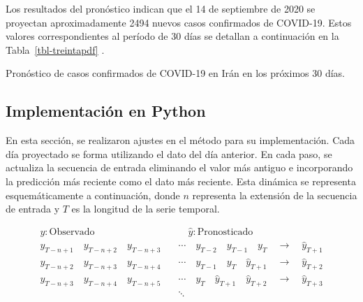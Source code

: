\documentclass[
  us-letterpaper,
]{scrreprt}
\theoremstyle{plain}
\theoremstyle{definition}
\theoremstyle{definition}
\theoremstyle{plain}
\theoremstyle{remark}
\begin{document}
Los resultados del pronóstico indican que el 14 de septiembre de 2020 se
proyectan aproximadamente 2494 nuevos casos confirmados de COVID-19.
Estos valores correspondientes al período de 30 días se detallan a
continuación en la Tabla~\ref{tbl-treintapdf} .

\begin{table}

\caption{\label{tbl-treintapdf}Pronóstico de casos confirmados de
COVID-19 en Irán en los próximos 30 días.}


\end{table}%

\subsection{Implementación en Python}\label{implementaciuxf3n-en-python}

En esta sección, se realizaron ajustes en el método para su
implementación. Cada día proyectado se forma utilizando el dato del día
anterior. En cada paso, se actualiza la secuencia de entrada eliminando
el valor más antiguo e incorporando la predicción más reciente como el
dato más reciente. Esta dinámica se representa esquemáticamente a
continuación, donde \(n\) representa la extensión de la secuencia de
entrada y \(T\) es la longitud de la serie temporal.

\[
\begin{split}
y:\text{Observado}\quad &\quad \hat{y}:\text{Pronosticado}\\
y_{T-n+1}\quad y_{T-n+2}\quad y_{T-n+3}\quad&\cdots\quad y_{T-2}\quad y_{T-1}\quad y_T\quad \to\quad \hat{y}_{T+1}\\
y_{T-n+2}\quad y_{T-n+3}\quad y_{T-n+4}\quad&\cdots\quad y_{T-1}\quad y_{T}\quad \hat{y}_{T+1}\quad \to\quad \hat{y}_{T+2}\\
y_{T-n+3}\quad y_{T-n+4}\quad y_{T-n+5}\quad&\cdots\quad y_{T}\quad \hat{y}_{T+1}\quad \hat{y}_{T+2}\quad \to\quad \hat{y}_{T+3}\\
&\ddots\\
\end{split}
\]
\end{document}
